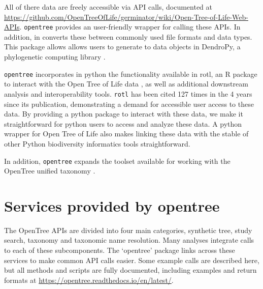 \documentclass[oupdraft]{sysbio_sse}
\begin{document}
All of there data are freely accessible via API calls, documented at \url{https://github.com/OpenTreeOfLife/germinator/wiki/Open-Tree-of-Life-Web-APIs}.
\texttt{opentree}  provides an user-friendly wrapper for calling these APIs.
In addition, in converts these between commonly used file formats and data types.
This package allows allows users to generate to data objects in DendroPy, a phylogenetic computing library \citep{sukumaran_dendropy_2010}.


\texttt{opentree} incorporates in python the functionality available in rotl, an {R} package to interact with the Open Tree of Life data \citep{michonneau_rotl_2016}, as well as additional downstream analysis and interoperability tools.
\texttt{rotl}  has been cited 127 times in the 4 years since its publication, demonstrating a demand for accessible user access to these data.
By providing a python package to interact with these data, we make it straightforward for python users to access and analyze these data.
A python wrapper for Open Tree of Life also makes linking these data with the stable of other Python biodiversity informatics tools straightforward.

In addition, \texttt{opentree} expands the toolset available for working with the OpenTree unified taxonomy \citep{rees_automated_2017}.


\bigskip
\section{Services provided by opentree}
\label{sec3}


The OpenTree APIs are divided into four main categories, synthetic tree, study search, taxonomy and taxonomic name resolution.
Many analyses integrate calls to each of these subcomponents. 
The `opentree' package links across these services to make common API calls easier.
Some example calls are described here, but all methods and scripts are fully documented, including examples and return formats at \url{https://opentree.readthedocs.io/en/latest/}.
\end{document}
